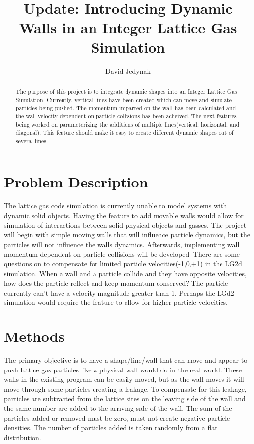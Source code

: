 \documentclass{article}
\begin{document}
\lstset{language=C} 
\title{Update: Introducing Dynamic Walls in an Integer Lattice Gas Simulation}
\author{David Jedynak}
\maketitle
\begin{abstract}
The purpose of this project is to integrate dynamic shapes into an Integer Lattice Gas Simulation. Currently, vertical lines have been created which can move and simulate particles being pushed. The momentum imparted on the wall has been calculated and the wall velocity dependent on particle collisions has been acheived. The next features being worked on parameterizing the additions of multiple lines(vertical, horizontal, and diagonal). This feature should make it easy to create different dynamic shapes out of several lines. 
\end{abstract}
\section{Problem Description}
The lattice gas code simulation is currently unable to model systems with dynamic solid objects. Having the feature to add movable walls would allow for simulation of interactions between solid physical objects and gasses. The project will begin with simple moving walls that will influence particle dynamics, but the particles will not influence the walls dynamics. Afterwards, implementing wall momentum dependent on particle collisions will be developed. There are some questions on to compensate for limited particle velocities(-1,0,+1) in the LG2d simulation. When a wall and a particle collide and they have opposite velocities, how does the particle reflect and keep momentum conserved? The particle currently can't have a velocity magnitude greater than 1. Perhaps the LGd2 simulation would require the feature to allow for higher particle velocities.
\section{Methods}
The primary objective is to have a shape/line/wall that can move and appear to push lattice gas particles like a physical wall would do in the real world. These walls in the existing program can be easily moved, but as the wall moves it will move through some particles creating a leakage. To compensate for this leakage, particles are subtracted from the lattice sites on the leaving side of the wall and the same number are added to the arriving side of the wall. The sum of the particles added or removed must be zero, must not create negative particle densities. The number of particles added is taken randomly from a flat distribution. 
\end{document}
